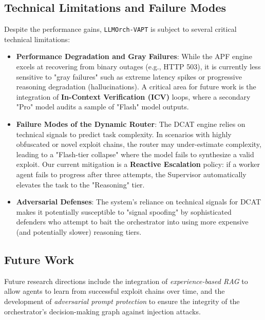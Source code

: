 \subsection{Technical Limitations and Failure Modes}
Despite the performance gains, \texttt{LLMOrch-VAPT} is subject to several critical technical limitations:
\begin{itemize}
    \item \textbf{Performance Degradation and Gray Failures}: While the APF engine excels at recovering from binary outages (e.g., HTTP 503), it is currently less sensitive to "gray failures" such as extreme latency spikes or progressive reasoning degradation (hallucinations). A critical area for future work is the integration of \textbf{In-Context Verification (ICV)} loops, where a secondary "Pro" model audits a sample of "Flash" model outputs.
    \item \textbf{Failure Modes of the Dynamic Router}: The DCAT engine relies on technical signals to predict task complexity. In scenarios with highly obfuscated or novel exploit chains, the router may under-estimate complexity, leading to a "Flash-tier collapse" where the model fails to synthesize a valid exploit. Our current mitigation is a \textbf{Reactive Escalation} policy: if a worker agent fails to progress after three attempts, the Supervisor automatically elevates the task to the "Reasoning" tier.
    \item \textbf{Adversarial Defenses}: The system's reliance on technical signals for DCAT makes it potentially susceptible to "signal spoofing" by sophisticated defenders who attempt to bait the orchestrator into using more expensive (and potentially slower) reasoning tiers.
\end{itemize}

\subsection{Future Work}
Future research directions include the integration of \textit{experience-based RAG} to allow agents to learn from successful exploit chains over time, and the development of \textit{adversarial prompt protection} to ensure the integrity of the orchestrator's decision-making graph against injection attacks.
